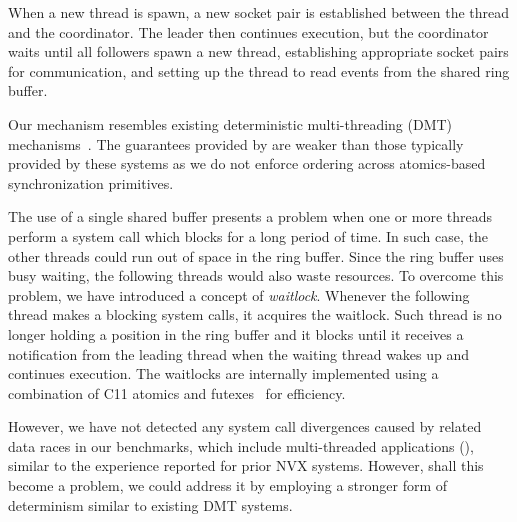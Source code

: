 When a new thread is spawn, a new socket pair is established between the thread
and the coordinator. The leader then continues execution, but the coordinator
waits until all followers spawn a new thread, establishing appropriate socket
pairs for communication, and setting up the thread to read events from the
shared ring buffer.

Our mechanism resembles existing deterministic multi-threading (DMT)
mechanisms~\cite{coredet:asplos10,dthreads:sosp11}. The guarantees
provided by \vx are weaker than those typically provided by these
systems as we do not enforce ordering across atomics-based
synchronization primitives.

The use of a single shared buffer presents a problem when one or more threads
perform a system call which blocks for a long period of time. In such case, the
other threads could run out of space in the ring buffer. Since the ring buffer
uses busy waiting, the following threads would also waste resources. To overcome
this problem, we have introduced a concept of \emph{waitlock}. Whenever the
following thread makes a blocking system calls, it acquires the waitlock. Such
thread is no longer holding a position in the ring buffer and it blocks until it
receives a notification from the leading thread when the waiting thread wakes up
and continues execution. The waitlocks are internally implemented using a
combination of C11 atomics and futexes~\cite{futex} for efficiency.

%
However, we have not detected any system call divergences caused by
related data races in our benchmarks, which include multi-threaded
applications (\eg \redis), similar to the experience reported for
prior NVX systems.  However, shall this become a problem, we could
address it by employing a stronger form of determinism similar to
existing DMT systems.


